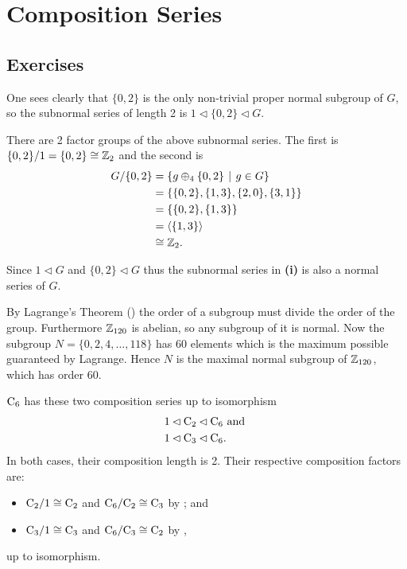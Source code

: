 \section{Composition Series}
\subsection*{Exercises}
\begin{questions}
    \item \begin{partquestions}{\roman*}
        \item One sees clearly that $\{0, 2\}$ is the only non-trivial proper normal subgroup of $G$, so the subnormal series of length 2 is $1 \lhd \{0, 2\} \lhd G$.
        \item There are 2 factor groups of the above subnormal series. The first is $\{0, 2\} / 1 = \{0, 2\} \cong \mathbb{Z}_2$ and the second is
        \begin{align*}
            G / \{0, 2\} &= \{g \oplus_4 \{0, 2\} \vert g \in G\}\\
            &= \{\{0, 2\}, \{1, 3\}, \{2, 0\}, \{3, 1\}\}\\
            &= \{\{0, 2\}, \{1, 3\}\}\\
            &= \langle \{1, 3\} \rangle\\
            &\cong \Z_2.
        \end{align*}
        \item Since $1 \lhd G$ and $\{0, 2\} \lhd G$ thus the subnormal series in \textbf{(i)} is also a normal series of $G$.
    \end{partquestions}

    \item By Lagrange's Theorem () the order of a subgroup must divide the order of the group. Furthermore $\mathbb{Z}_{120}$ is abelian, so any subgroup of it is normal. Now the subgroup $N = \{0, 2, 4, \dots, 118\}$ has 60 elements which is the maximum possible guaranteed by Lagrange. Hence $N$ is the maximal normal subgroup of $\mathbb{Z}_{120}$, which has order 60.

    \item $\mathrm{C}_{6}$ has these two composition series up to isomorphism
    \begin{align*}
        &1 \lhd \mathrm{C}_{2} \lhd \mathrm{C}_{6} \text{ and }\\
        &1 \lhd \mathrm{C}_{3} \lhd \mathrm{C}_{6}.
    \end{align*}
    In both cases, their composition length is 2. Their respective composition factors are:
    \begin{itemize}
        \item $\mathrm{C}_{2} / 1 \cong \mathrm{C}_{2}$ and $\mathrm{C}_{6} / \mathrm{C}_{2} \cong \mathrm{C}_{3}$ by ; and
        \item $\mathrm{C}_{3} / 1 \cong \mathrm{C}_{3}$ and $\mathrm{C}_{6} / \mathrm{C}_{3} \cong \mathrm{C}_{2}$ by ,
    \end{itemize}
    up to isomorphism.


\end{questions}
